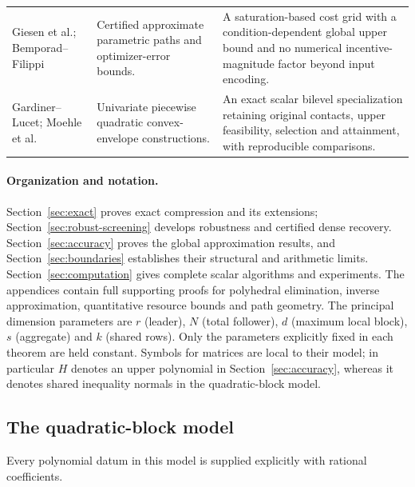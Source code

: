 \begin{table}[t]
\begin{tabular}{@{}>{\raggedright\arraybackslash}p{.23\linewidth}>{\raggedright\arraybackslash}p{.32\linewidth}>{\raggedright\arraybackslash}p{.39\linewidth}@{}}
Giesen et al.; Bemporad--Filippi
\cite{GiesenJaggiLaue2012,GiesenEtAl2012,BemporadFilippi2001} &
Certified approximate parametric paths and optimizer-error bounds. &
A saturation-based cost grid with a condition-dependent global upper bound
and no numerical incentive-magnitude factor beyond input encoding.\\[5pt]
Gardiner--Lucet; Moehle et al.
\cite{GardinerLucet2010,MoehleEtAl2023} &
Univariate piecewise quadratic convex-envelope constructions. &
An exact scalar bilevel specialization retaining original contacts, upper
feasibility, selection and attainment, with reproducible comparisons.\\
\bottomrule
\end{tabular}
\end{table}

\paragraph{Organization and notation.}
Section~\ref{sec:exact} proves exact compression and its extensions;
Section~\ref{sec:robust-screening} develops robustness and certified dense
recovery. Section~\ref{sec:accuracy} proves the global approximation results,
and Section~\ref{sec:boundaries} establishes their structural and arithmetic
limits. Section~\ref{sec:computation} gives complete scalar algorithms and
experiments. The appendices contain full supporting proofs for polyhedral
elimination, inverse approximation, quantitative resource bounds and path
geometry. The principal dimension parameters are $r$ (leader), $N$ (total
follower), $d$ (maximum local block), $s$ (aggregate) and $k$ (shared rows).
Only the parameters explicitly fixed in each theorem are held constant.
Symbols for matrices are local to their model; in particular $H$ denotes an
upper polynomial in Section~\ref{sec:accuracy}, whereas it denotes shared
inequality normals in the quadratic-block model.

\subsection{The quadratic-block model}\label{subsec:model}

Every polynomial datum in this model is supplied explicitly with rational
coefficients.

